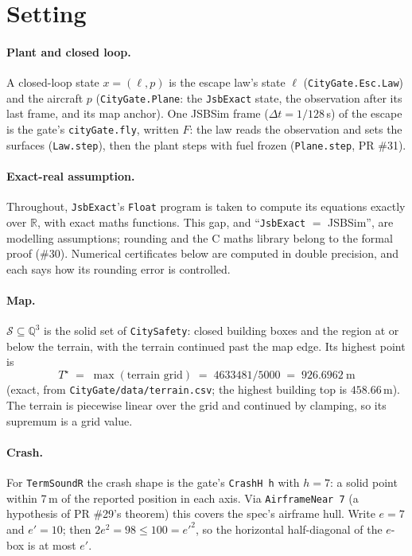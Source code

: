\documentclass[11pt]{article}
\newcommand{\R}{\mathbb{R}}
\newcommand{\Q}{\mathbb{Q}}
\newcommand{\Solid}{\mathcal{S}}
\begin{document}
\tableofcontents

\section{Setting}\label{sec:setting}

\paragraph{Plant and closed loop.} A closed-loop state $x = (\ell, p)$ is the escape law's state $\ell$ (\texttt{CityGate.Esc.Law}) and the aircraft $p$ (\texttt{CityGate.Plane}: the \texttt{JsbExact} state, the observation after its last frame, and its map anchor). One JSBSim frame ($\Delta t = 1/128$\,s) of the escape is the gate's \texttt{cityGate.fly}, written $F$: the law reads the observation and sets the surfaces (\texttt{Law.step}), then the plant steps with fuel frozen (\texttt{Plane.step}, PR \#31).

\paragraph{Exact-real assumption.} Throughout, \texttt{JsbExact}'s \texttt{Float} program is taken to compute its equations exactly over $\R$, with exact maths functions. This gap, and ``\texttt{JsbExact} $=$ JSBSim'', are modelling assumptions; rounding and the C maths library belong to the formal proof (\#30). Numerical certificates below are computed in double precision, and each says how its rounding error is controlled.

\paragraph{Map.} $\Solid \subseteq \Q^3$ is the solid set of \texttt{CitySafety}: closed building boxes and the region at or below the terrain, with the terrain continued past the map edge. Its highest point is
\[ T^\star \;=\; \max(\text{terrain grid}) \;=\; 4633481/5000 \;=\; 926.6962\ \text{m} \]
(exact, from \texttt{CityGate/data/terrain.csv}; the highest building top is $458.66$\,m). The terrain is piecewise linear over the grid and continued by clamping, so its supremum is a grid value.

\paragraph{Crash.} For \texttt{TermSoundR} the crash shape is the gate's \texttt{CrashH h} with $h = 7$: a solid point within 7\,m of the reported position in each axis. Via \texttt{AirframeNear 7} (a hypothesis of PR \#29's theorem) this covers the spec's airframe hull. Write $e = 7$ and $e' = 10$; then $2e^2 = 98 \le 100 = e'^2$, so the horizontal half-diagonal of the $e$-box is at most $e'$.
\end{document}
